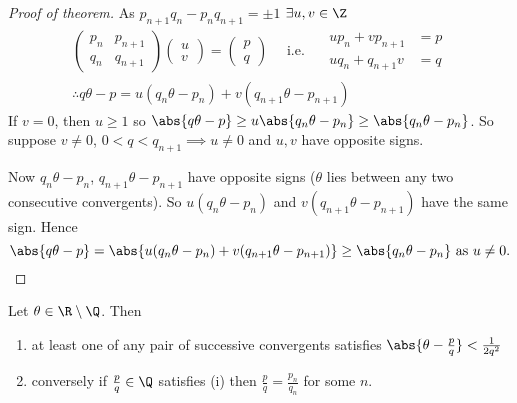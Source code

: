 \documentclass{article}
\begin{document}
\begin{proof}[Proof of theorem]
    As $p_{n+1} q_n - p_n q_{n+1} = \pm 1$ $\exists u, v \in \Z$
    \begin{gather*}
        \begin{pmatrix} p_n & p_{n+1} \\ q_n & q_{n+1} \end{pmatrix}
        \begin{pmatrix} u \\ v \end{pmatrix} = \begin{pmatrix} p \\ q \end{pmatrix}
        \quad \text{ i.e. } \quad
        \begin{matrix}
            u p_n + v p_{n+1} &= p \\
            u q_n + q_{n+1} v &= q
        \end{matrix}
        \\
        \therefore q \theta - p = u(q_n \theta - p_n) + v (q_{n+1} \theta - p_{n+1})
    \end{gather*}
    If $v = 0$, then $u \geq 1$ so $\abs{q \theta - p} \geq u \abs{q_n \theta - p_n} \geq \abs{q_n \theta - p_n}$.
    So suppose $v \neq 0$, $0 < q < q_{n+1} \implies u \neq 0$ and $u, v$ have opposite signs.

    Now $q_n \theta - p_n$, $q_{n+1} \theta - p_{n+1}$ have opposite signs ($\theta$ lies between any two consecutive convergents).
    So $u (q_n \theta - p_n)$ and $v (q_{n+1} \theta - p_{n+1})$ have the same sign. Hence
    \begin{equation*}
        \abs{q \theta - p} = \abs{u (q_n \theta - p_n) + v (q_{n+1} \theta - p_{n+1})} \geq \abs{q_n \theta - p_n} \text{ as } u \neq 0.
    \end{equation*}
\end{proof}

\begin{nthm}\label{thm:6.6}
    Let $\theta \in \R \setminus \Q$. Then
    \begin{enumerate}[label=(\roman*)]
        \item at least one of any pair of successive convergents satisfies $\abs{\theta - \frac{p}{q}} < \frac{1}{2 q^2}$
        \item conversely if $\frac{p}{q} \in \Q$ satisfies (i) then $\frac{p}{q} = \frac{p_n}{q_n}$ for some $n$.
    \end{enumerate}
\end{nthm}
\end{document}
